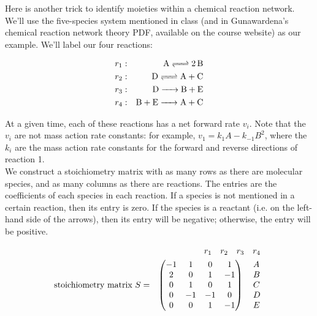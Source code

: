 \documentclass{article}
\begin{document}
\large

Here is another trick to identify moieties within a chemical reaction network. We'll use the five-species system mentioned in class (and in Gunawardena's chemical reaction network theory PDF, available on the course website) as our example. We'll  label our four reactions:

\begin{eqnarray*}
r_1: & &  \ce{A <=>  2B }\\
r_2: & &  \ce{D <=>  A + C }\\
r_3: & &  \ce{D ->  B + E }\\
r_4: & &  \ce{B + E ->  A + C }\\
\end{eqnarray*}

At a given time, each of these reactions has a net forward rate $v_i$. Note that the $v_i$ are not mass action rate constants: for example, $v_1 = k_1 A - k_{-1} B^2$, where the $k_i$ are the mass action rate constants for the forward and reverse directions of reaction 1.\\

We construct a stoichiometry matrix with as many rows as there are molecular species, and as many columns as there are reactions. The entries are the coefficients of each species in each reaction. If a species is not mentioned in a certain reaction, then its entry is zero. If the species is a reactant (i.e. on the left-hand side of the arrows), then its entry will be negative; otherwise, the entry will be positive.

\begin{eqnarray*}
&  & \hspace{0.25cm}
\begin{array}{ccccc}
       r_1 & r_2 & r_3 & r_4
     \end{array}\\
\textrm{stoichiometry matrix } S & = & \begin{pmatrix} -1 & 1 & 0 & 1\\
2 & 0 & 1 & -1\\
0 & 1 & 0 & 1\\
0 & -1 & -1 & 0\\
0 & 0 & 1 & -1
\end{pmatrix} 
\hspace{0.2 cm}
\begin{array}{l}
       A\\
      B\\
      C\\
      D\\
      E
     \end{array}
\end{eqnarray*}
\end{document}
